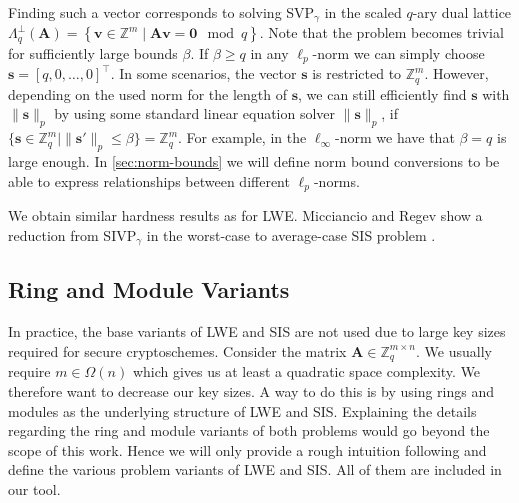 Finding such a vector corresponds to solving SVP$_\gamma$ in the scaled $q$-ary dual lattice $\Lambda_q^\perp(\mathbf{A}) = \left\{ \mathbf{v} \in \mathbb{Z}^m \mid  \mathbf{A}\mathbf{v} = \mathbf{0} \mod q \right\}$. Note that the problem becomes trivial for sufficiently large bounds $\beta$. If $\beta\geq q$ in any $\ell_p$-norm we can simply choose $\mathbf{s} = [q, 0, \dots, 0]^\intercal$. In some scenarios, the vector $\mathbf{s}$ is restricted to $\mathbb{Z}_q^m$. However, depending on the used norm for the length of $\mathbf{s}$, we can still efficiently find $\mathbf{s}$ with $\|\mathbf{s}\|_p$ by using some standard linear equation solver $\|\mathbf{s}\|_p$, if $\{\mathbf{s}\in \mathbb{Z}_q^m \mid \|\mathbf{s}'\|_p \leq \beta\} = \mathbb{Z}_q^m$. For example, in the $\ell_\infty$-norm we have that $\beta=q$ is large enough. In \cref{sec:norm-bounds} we will define norm bound conversions to be able to express relationships between different  $\ell_p$-norms.

We obtain similar hardness results as for LWE. Micciancio and Regev show a reduction from SIVP$_\gamma$ in the worst-case to average-case SIS problem \cite{MR04}.



\subsection{Ring and Module Variants}\label{sec:ring-module}
In practice, the base variants of LWE and SIS are not used due to large key sizes required for secure cryptoschemes. Consider the matrix $\mathbf{A} \in \mathbb{Z}_q^{m \times n}$. We usually require $m \in \Omega(n)$ which gives us at least a quadratic space complexity. We therefore want to decrease our key sizes. A way to do this is by using rings and modules as the underlying structure of LWE and SIS. Explaining the details regarding the ring and module variants of both problems would go beyond the scope of this work. Hence we will only provide a rough intuition following \cite{Reg10} and define the various problem variants of LWE and SIS. All of them are included in our tool.

